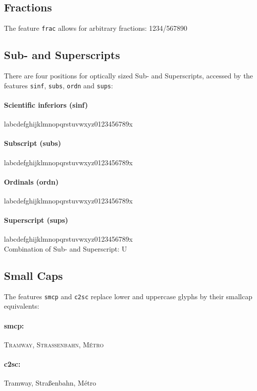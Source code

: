 \documentclass[pagesize,DIV14]{scrartcl}
\begin{document}
\subsection{Fractions}
The feature \texttt{frac} allows for arbitrary fractions: { 1234/567890}

\subsection{Sub- and Superscripts}
There are four positions for optically sized Sub- and Superscripts, accessed by the features \texttt{sinf}, \texttt{subs}, \texttt{ordn} and \texttt{sups}:
\paragraph*{Scientific inferiors (sinf)} l{abcdefghijklmnopqrstuvwxyz0123456789}x
\paragraph*{Subscript (subs)} l{abcdefghijklmnopqrstuvwxyz0123456789}x
\paragraph*{Ordinals (ordn)} l{abcdefghijklmnopqrstuvwxyz0123456789}x
\paragraph*{Superscript (sups)} l{abcdefghijklmnopqrstuvwxyz0123456789}x
\\
\setlength\subsupersep{1pt}
Combination of Sub- and Superscript: U
\subsection{Small Caps}
The features \texttt{smcp} and \texttt{c2sc} replace lower and uppercase glyphs by their smallcap equivalents:
\paragraph*{smcp:} \textsc{Tramway, Straßenbahn, Métro}
\paragraph*{c2sc:} {Tramway, Straßenbahn, Métro}
\end{document}
